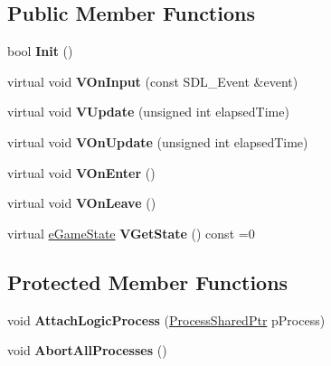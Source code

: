 \subsection*{Public Member Functions}
\begin{DoxyCompactItemize}
\item 
\hypertarget{classBaseGameState_a902ab7154d50a7450813e8819460983e}{bool {\bfseries Init} ()}\label{classBaseGameState_a902ab7154d50a7450813e8819460983e}

\item 
\hypertarget{classBaseGameState_a9b2255147b39b61b56bdd7b718e04aff}{virtual void {\bfseries V\-On\-Input} (const S\-D\-L\-\_\-\-Event \&event)}\label{classBaseGameState_a9b2255147b39b61b56bdd7b718e04aff}

\item 
\hypertarget{classBaseGameState_aabc175d869400a697de3fa045b3313e3}{virtual void {\bfseries V\-Update} (unsigned int elapsed\-Time)}\label{classBaseGameState_aabc175d869400a697de3fa045b3313e3}

\item 
\hypertarget{classBaseGameState_ab1e9b16178f4eef257b129bb7c229555}{virtual void {\bfseries V\-On\-Update} (unsigned int elapsed\-Time)}\label{classBaseGameState_ab1e9b16178f4eef257b129bb7c229555}

\item 
\hypertarget{classBaseGameState_ac79790443c5757d50a64491c32ffd921}{virtual void {\bfseries V\-On\-Enter} ()}\label{classBaseGameState_ac79790443c5757d50a64491c32ffd921}

\item 
\hypertarget{classBaseGameState_a91421cb56abd7f5517a70429c2fe748f}{virtual void {\bfseries V\-On\-Leave} ()}\label{classBaseGameState_a91421cb56abd7f5517a70429c2fe748f}

\item 
\hypertarget{classBaseGameState_a8173eabbdcbfbee90c83086bdf6d1fcd}{virtual \hyperlink{BaseGameState_8h_ae12dcfc1b1e01980b11e116e3af6807f}{e\-Game\-State} {\bfseries V\-Get\-State} () const =0}\label{classBaseGameState_a8173eabbdcbfbee90c83086bdf6d1fcd}

\end{DoxyCompactItemize}
\subsection*{Protected Member Functions}
\begin{DoxyCompactItemize}
\item 
\hypertarget{classBaseGameState_aa5fa0c918f67dda17846a7077e0aaaf6}{void {\bfseries Attach\-Logic\-Process} (\hyperlink{Process_8h_af04951552f62d8a3c69cca91c23500cc}{Process\-Shared\-Ptr} p\-Process)}\label{classBaseGameState_aa5fa0c918f67dda17846a7077e0aaaf6}

\item 
\hypertarget{classBaseGameState_afd5820eefc569b6b99eab1d055789622}{void {\bfseries Abort\-All\-Processes} ()}\label{classBaseGameState_afd5820eefc569b6b99eab1d055789622}

\end{DoxyCompactItemize}


